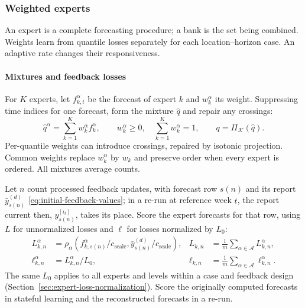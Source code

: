 \documentclass[11pt,a4paper]{article}
\newcommand{\A}{\mathcal{A}}
\newcommand{\K}{\mathcal{K}}
\theoremstyle{definition}
\theoremstyle{remark}
\begin{document}
\subsubsection{Weighted experts}
\setcounter{secnumdepth}{4}
\label{sec:expert-weighting}
An expert is a complete forecasting procedure; a bank is the set being
combined. Weights learn from quantile losses separately for each
location--horizon case. An adaptive rate changes their responsiveness.

\paragraph{Mixtures and feedback losses}
For $K$ experts, let $f_{k,t}^\alpha$ be the forecast of expert $k$ and
$w_k^\alpha$ its weight. Suppressing time indices for one forecast,
form the mixture $\hat q$ and repair any crossings:
\begin{equation}
 \hat q^\alpha=\sum_{k=1}^K w_k^\alpha f_k^\alpha,
 \qquad w_k^\alpha\ge0,\quad \sum_{k=1}^K w_k^\alpha=1,
 \qquad q=\Pi_\K(\hat q).
 \label{eq:expert-mixture}
\end{equation}
Per-quantile weights can introduce crossings, repaired by isotonic
projection. Common weights replace $w_k^\alpha$ by $w_k$ and preserve
order when every expert is ordered. All mixtures average counts.

Let $n$ count processed feedback updates, with forecast row $s(n)$ and
its report $\bar y_{s(n)}^{(d)}$ \eqref{eq:initial-feedback-values}; in a
re-run at reference week $t$, the report current then,
$y_{s(n)}^{[\iota_t]}$, takes its place. Score the expert forecasts for
that row, using $L$ for unnormalized losses and $\ell$ for losses
normalized by $L_0$:
\begin{align}
 L_{k,n}^\alpha
 &=\rho_\alpha\!\left(f_{k,s(n)}^\alpha/c_{\mathrm{scale}},
                      \bar y_{s(n)}^{(d)}/c_{\mathrm{scale}}\right),
 &L_{k,n}&=\frac{1}{m}\sum_{\alpha\in\A}L_{k,n}^\alpha,
 \label{eq:expert-feedback-loss}\\
 \ell_{k,n}^\alpha&=L_{k,n}^\alpha/L_0,
 &\ell_{k,n}&=\frac{1}{m}\sum_{\alpha\in\A}\ell_{k,n}^\alpha.
 \label{eq:normalized-expert-loss}
\end{align}
The same $L_0$ applies to all experts and levels within a case and
feedback design (Section~\ref{sec:expert-loss-normalization}). Score the
originally computed forecasts in stateful learning and the reconstructed
forecasts in a re-run.
\end{document}
